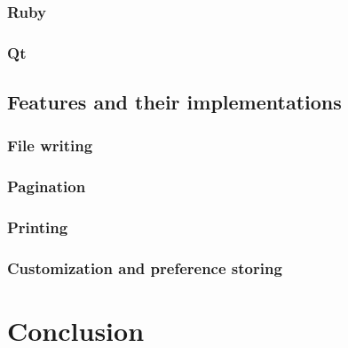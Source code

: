 \documentclass[11pt]{article}
\begin{document}
\subsubsection{Ruby}
\subsubsection{Qt}
\subsection{Features and their implementations}
\subsubsection{File writing}
\subsubsection{Pagination}
\subsubsection{Printing}
\subsubsection{Customization and preference storing}

\section{Conclusion}

\newpage
\nocite{*}


\end{document}
